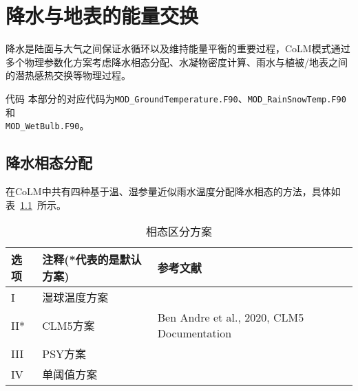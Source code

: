 \chapter{降水与地表的能量交换}
降水是陆面与大气之间保证水循环以及维持能量平衡的重要过程，CoLM模式通过多个物理参数化方案考虑降水相态分配、水凝物密度计算、雨水与植被/地表之间的潜热感热交换等物理过程。

\begin{mymdframed}{代码}
本部分的对应代码为\texttt{MOD\_GroundTemperature.F90}、\texttt{MOD\_RainSnowTemp.F90}和\\
\texttt{MOD\_WetBulb.F90}。
\end{mymdframed}

\section{降水相态分配}\label{相态分配}
在CoLM中共有四种基于温、湿参量近似雨水温度分配降水相态的方法，具体如表~\ref{tab:相态区分方案}~所示。

\begin{table}[]
\caption{相态区分方案}
\label{tab:相态区分方案}
\begin{tabular}[h]{p{1cm}p{5cm}p{10cm}}
\toprule
选项 & 注释(*代表的是默认方案) & 参考文献 \\\midrule
I & 湿球温度方案      & \citet{Wang-etal_19WetBulb}   \\
II*  & CLM5方案      & Ben Andre et al., 2020, CLM5 Documentation      \\
III  & PSY方案     & \citet{harder2013estimating}     \\
IV  & 单阈值方案     & \citet{us1956snow}     \\    \bottomrule

\end{tabular}
\end{table}

